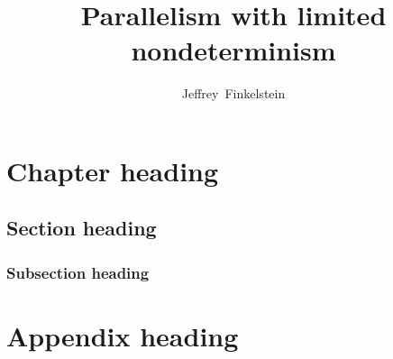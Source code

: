 \documentclass[
  12pt,  %
  oneside,  %
]
{book}
\title{Parallelism with limited nondeterminism}
\author{Jeffrey~Finkelstein}
\begin{document}
\frontmatter

\newpage

\newpage

\newpage
%
%

\newpage
%
\tableofcontents
\newpage
\listoftables
\newpage
\listoffigures
\newpage

\newpage

\newpage

\mainmatter
\chapter{Chapter heading}
\section{Section heading}
\subsection{Subsection heading}
\lipsum

\backmatter
\chapter{Appendix heading}


\newpage


\end{document}
